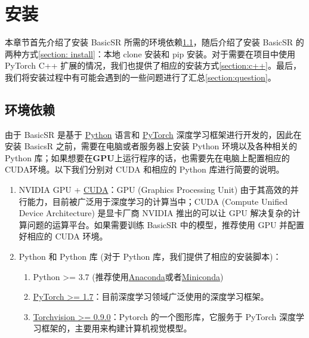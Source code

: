 \documentclass[../main.tex]{subfiles}
\begin{document}
\chapter{安装}
\vspace{-2cm}


本章节首先介绍了安装 BasicSR 所需的环境依赖\ref{section: env reqirement}，随后介绍了安装 BasicSR 的两种方式\ref{section: install}：本地 clone 安装和 pip 安装。对于需要在项目中使用 PyTorch C++ 扩展的情况，我们也提供了相应的安装方式\ref{section:c++}。最后，我们将安装过程中有可能会遇到的一些问题进行了汇总\ref{section:question}。

\section{环境依赖}
\label{section: env reqirement}

由于 BasicSR 是基于 \href{https://www.python.org/}{Python} 语言和 \href{https://pytorch.org/}{PyTorch} 深度学习框架进行开发的，因此在安装 BasicsR 之前，需要在电脑或者服务器上安装 Python 环境以及各种相关的 Python 库；如果想要在\textbf{GPU}上运行程序的话，也需要先在电脑上配置相应的CUDA环境。以下我们分别对 CUDA 和相应的 Python 库进行简要的说明。

\begin{enumerate}
    \item NVIDIA GPU + \href{https://developer.nvidia.com/cuda-downloads}{CUDA}：GPU (Graphics Processing Unit) 由于其高效的并行能力，目前被广泛用于深度学习的计算当中；CUDA (Compute Unified Device Architecture) 是显卡厂商 NVIDIA 推出的可以让 GPU 解决复杂的计算问题的运算平台。如果需要训练 BasicSR 中的模型，推荐使用 GPU 并配置好相应的 CUDA 环境。

    \item Python 和 Python 库 (对于 Python 库，我们提供了相应的安装脚本)：
    \begin{enumerate}
        \item Python >= 3.7 (推荐使用\href{https://www.anaconda.com/products/distribution#linux}{Anaconda}或者\href{https://docs.conda.io/en/latest/miniconda.html}{Miniconda})
        \item \href{https://pytorch.org/}{PyTorch >= 1.7}：目前深度学习领域广泛使用的深度学习框架。
        \item \href{https://pytorch.org/}{Torchvision >= 0.9.0}：Pytorch 的一个图形库，它服务于 PyTorch 深度学习框架的，主要用来构建计算机视觉模型。
    \end{enumerate}
\end{enumerate}
\end{document}

